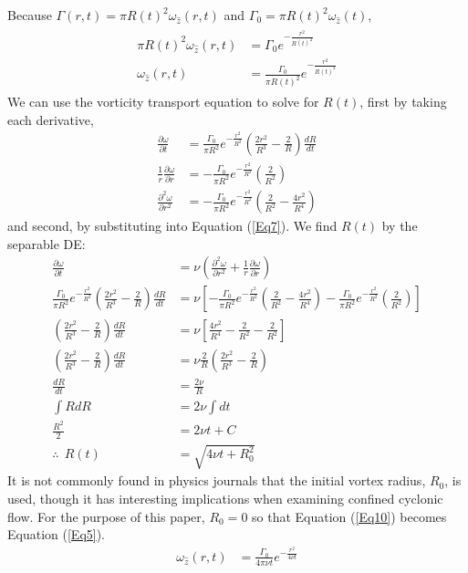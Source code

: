 \documentclass{article}
\begin{document}
Because $\Gamma (r,t)=\pi R(t)^2 \omega_{\hat{z}}(r,t)$ and $\Gamma_0=\pi R(t)^2 \omega_{\hat{z}}(t)$,
\begin{align}\label{Eq10}
\begin{split}
    \pi R(t)^2 \omega_{\hat{z}}(r,t) &= \Gamma_0 e^{-\frac{r^2}{R(t)^2}}\\
    \omega_{\hat{z}}(r,t) &=\frac{\Gamma_0}{\pi R(t)^2} e^{-\frac{r^2}{R(t)^2}}
\end{split}
\end{align}
We can use the vorticity transport equation to solve for $R(t)$, first by taking each derivative,
\begin{align*}
    \frac{\partial \omega}{\partial t} &= \frac{\Gamma_0}{\pi R^2} e^{-\frac{r^2}{R^2}}\left( \frac{2r^2}{R^3}-\frac{2}{R} \right)\frac{dR}{dt}\\
    \frac{1}{r}\frac{\partial \omega}{\partial r}&= -\frac{\Gamma_0}{\pi R^2} e^{-\frac{r^2}{R^2}}\left( \frac{2}{R^2}\right) \\
    \frac{\partial^2 \omega}{\partial r^2}&= -\frac{\Gamma_0}{\pi R^2} e^{-\frac{r^2}{R^2}}\left( \frac{2}{R^2}-\frac{4r^2}{R^4}\right)
\end{align*}
and second, by substituting into Equation (\ref{Eq7}). We find $R(t)$ by the separable DE:
\begin{align*}
    \frac{\partial \omega}{\partial t} &=\nu \left(\frac{\partial^2 \omega}{\partial r^2}+\frac{1}{r}\frac{\partial \omega}{\partial r}\right)\\
    \frac{\Gamma_0}{\pi R^2} e^{-\frac{r^2}{R^2}}\left( \frac{2r^2}{R^3}-\frac{2}{R} \right)\frac{dR}{dt} &= \nu \left[ -\frac{\Gamma_0}{\pi R^2} e^{-\frac{r^2}{R^2}}\left( \frac{2}{R^2}-\frac{4r^2}{R^4}\right) -\frac{\Gamma_0}{\pi R^2} e^{-\frac{r^2}{R^2}}\left( \frac{2}{R^2}\right) \right]\\
    \left( \frac{2r^2}{R^3}-\frac{2}{R} \right)\frac{dR}{dt} &= \nu \left[ \frac{4r^2}{R^4}-\frac{2}{R^2} -\frac{2}{R^2} \right]\\
    \left( \frac{2r^2}{R^3}-\frac{2}{R} \right)\frac{dR}{dt} &= \nu \frac{2}{R} \left( \frac{2r^2}{R^3}-\frac{2}{R} \right)\\
    \frac{dR}{dt} &= \frac{2\nu }{R}\\
    \int RdR &= 2\nu \int dt\\
    \frac{R^2}{2} &= 2\nu t +C\\
    \therefore \:\: R(t) &= \sqrt{4\nu t +R_0^2}
\end{align*}
It is not commonly found in physics journals that the initial vortex radius, $R_0$, is used, though it has interesting implications when examining confined cyclonic flow. For the purpose of this paper, $R_0=0$ so that Equation (\ref{Eq10}) becomes Equation (\ref{Eq5}).
\begin{align*}
    \omega_{\hat{z}}(r,t) &=\frac{\Gamma_0}{4\pi \nu t} e^{-\frac{r^2}{4\nu t}}
\end{align*}
\end{document}
